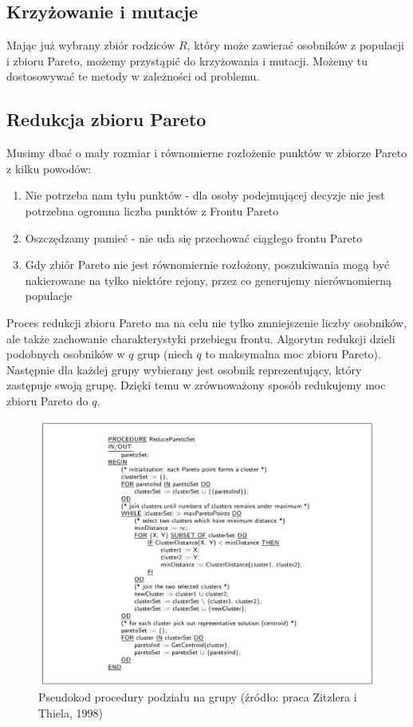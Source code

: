 \documentclass[a4paper]{article}
\begin{document}
\subsection{Krzyżowanie i mutacje}
Mając już wybrany zbiór rodziców $R$, który może zawierać osobników z populacji i zbioru Pareto, możemy przystąpić do krzyżowania i mutacji. Możemy tu dostosowywać te metody w zależności od problemu. 
\subsection{Redukcja zbioru Pareto}
Musimy dbać o mały rozmiar i równomierne rozłożenie punktów w zbiorze Pareto z kilku powodów:
\begin{enumerate}
\item Nie potrzeba nam tylu punktów - dla osoby podejmującej decyzje nie jest potrzebna ogromna liczba punktów z Frontu Pareto
\item Oszczędzamy pamieć - nie uda się przechować ciągłego frontu Pareto
\item Gdy zbiór Pareto nie jest równomiernie rozłożony, poszukiwania mogą być nakierowane na tylko niektóre rejony, przez co generujemy nierównomierną populacje
\end{enumerate}
Proces redukcji zbioru Pareto ma na celu nie tylko zmniejszenie liczby osobników, ale także zachowanie charakterystyki przebiegu frontu. Algorytm redukcji dzieli podobnych osobników w $q$ grup (niech $q$ to maksymalna moc zbioru Pareto). Następnie dla każdej grupy wybierany jest osobnik reprezentujący, który zastępuje swoją grupę. Dzięki temu w zrównoważony sposób redukujemy moc zbioru Pareto do $q$.
\begin{figure}[htbp]{}
\centerline{\includegraphics[scale=.25]{clustering.png}}
\caption{Pseudokod procedury podziału na grupy (źródło: praca Zitzlera i Thiela, 1998)}
\label{fig:clustering}
\end{figure}
\end{document}

